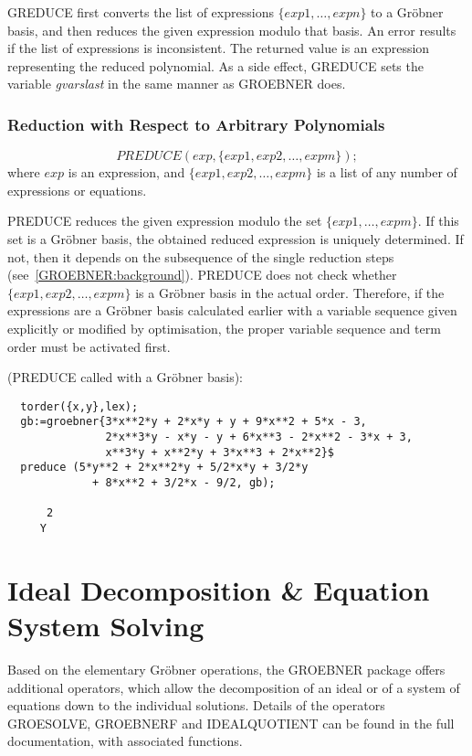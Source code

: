 GREDUCE first converts the list of expressions $\{exp1, \ldots ,
expn\}$ to a Gr\"obner basis, and then reduces the given expression
modulo that basis.  An error results if the list of expressions is
inconsistent.  The returned value is an expression representing the
reduced polynomial.  As a side effect, GREDUCE sets the variable {\it
gvarslast} in the same manner as GROEBNER does.


\subsubsection{Reduction with Respect to Arbitrary Polynomials}
\[
 PREDUCE(exp, \{exp1, exp2,\ldots , expm\});
\]
where $ exp $  is an expression, and $\{exp1, exp2, \ldots ,
expm \}$ is a list of any number of expressions or equations.

PREDUCE reduces the given expression modulo the set $\{exp1,
\ldots , expm\}$.  If this set is a Gr\"obner basis, the obtained reduced
expression is uniquely determined.  If not, then it depends on the
subsequence of the single reduction steps
(see~\ref{GROEBNER:background}).  PREDUCE does not check whether
$\{exp1, exp2, \ldots , expm\}$ is a Gr\"obner basis in the actual
order.  Therefore, if the expressions are a Gr\"obner basis calculated
earlier with a variable sequence given explicitly or modified by
optimisation, the proper variable sequence and term order must
be activated first.

\example (PREDUCE called with a Gr\"obner basis):
\begin{verbatim}
  torder({x,y},lex);
  gb:=groebner{3*x**2*y + 2*x*y + y + 9*x**2 + 5*x - 3,
               2*x**3*y - x*y - y + 6*x**3 - 2*x**2 - 3*x + 3,
               x**3*y + x**2*y + 3*x**3 + 2*x**2}$
  preduce (5*y**2 + 2*x**2*y + 5/2*x*y + 3/2*y
             + 8*x**2 + 3/2*x - 9/2, gb);

      2
     Y
\end{verbatim}


\section{Ideal Decomposition \& Equation System Solving}
Based on the elementary Gr\"obner operations, the GROEBNER package offers
additional operators, which allow the decomposition of an ideal or of a
system of equations down to the individual solutions.  Details of the
operators
GROESOLVE, GROEBNERF and IDEALQUOTIENT can be
found in the full documentation, with associated functions.


